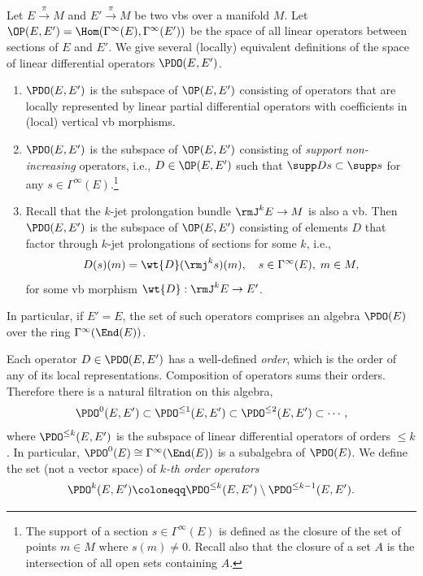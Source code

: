 \begin{defn}
    Let $E\overset{\pi}{\to}M$ and $E'\overset{\pi}{\to}M$ be two \glspl{vb} over a manifold $M$. Let $\OP(E,E')=\Hom(\Gamma^\infty(E), \Gamma^\infty(E'))$ be the space of all linear operators between sections of $E$ and $E'$. We give several (locally) equivalent definitions of the space of linear differential operators $\PDO(E,E')$.
    \begin{enumerate}
        \item $\PDO(E,E')$ is the subspace of $\OP(E,E')$ consisting of operators that are locally represented by linear partial differential operators with coefficients in (local) vertical \gls{vb} morphisms.
        \item $\PDO(E,E')$ is the subspace of $\OP(E,E')$ consisting of \emph{support non-increasing} operators, i.e., $D\in\OP(E,E')$ such that $\supp Ds\subset \supp s$ for any $s\in\Gamma^\infty(E)$.\footnote{The support of a section $s\in\Gamma^\infty(E)$ is defined as the closure of the set of points $m\in M$ where $s(m)\neq 0$. Recall also that the closure of a set $A$ is the intersection of all open sets containing $A$.}
        \item Recall that the $k$-jet prolongation bundle $\rmJ^k E\to M$ is also a \gls{vb}. Then $\PDO(E,E')$ is the subspace of $\OP(E,E')$ consisting of elements $D$ that factor through $k$-jet prolongations of sections for some $k$, i.e.,
        \[D(s)(m)=\wt{D}(\rmj^ks)(m),\quad s\in \Gamma^\infty(E),\; m\in M,\]
        for some \gls{vb} morphism $\wt{D}:\rmJ^kE\to E'$.
    \end{enumerate}
\end{defn}
\begin{defn}
    In particular, if $E'=E$, the set of such operators comprises an algebra $\PDO(E)$ over the ring $\Gamma^\infty(\End(E))$.
    
    Each operator $D\in\PDO(E,E')$ has a well-defined \emph{order}, which is the order of any of its local representations. Composition of operators sums their orders. Therefore there is a natural filtration on this algebra, 
    \[\PDO^0(E,E')\subset \PDO^{\leq 1}(E,E')\subset\PDO^{\leq 2}(E,E')\subset\cdots,\] 
    where $\PDO^{\leq k}(E,E')$ is the subspace of linear differential operators of orders $\leq k$. In particular, $\PDO^0(E)\cong \Gamma^\infty(\End(E))$ is a subalgebra of $\PDO(E)$. We define the set (not a vector space) of \emph{$k$-th order operators}
    \[\PDO^k(E,E')\coloneqq \PDO^{\leq k}(E,E')\setminus \PDO^{\leq k-1}(E,E').\]
\end{defn}

